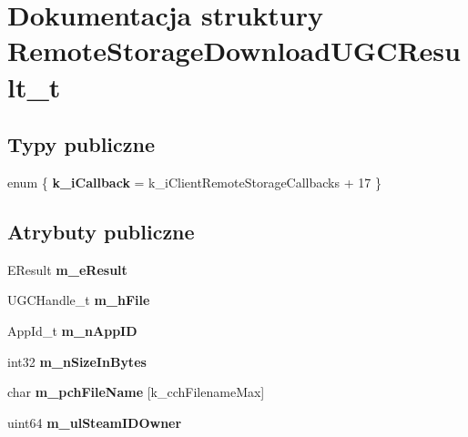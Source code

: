 \hypertarget{struct_remote_storage_download_u_g_c_result__t}{}\section{Dokumentacja struktury Remote\+Storage\+Download\+U\+G\+C\+Result\+\_\+t}
\label{struct_remote_storage_download_u_g_c_result__t}
\subsection*{Typy publiczne}
\begin{DoxyCompactItemize}
\item 
\mbox{\label{struct_remote_storage_download_u_g_c_result__t_a124c2a6e83082327dd38afdd26462eef}} 
enum \{ {\bfseries k\+\_\+i\+Callback} = k\+\_\+i\+Client\+Remote\+Storage\+Callbacks + 17
 \}
\end{DoxyCompactItemize}
\subsection*{Atrybuty publiczne}
\begin{DoxyCompactItemize}
\item 
\mbox{\label{struct_remote_storage_download_u_g_c_result__t_a3ac63272e086be4736891ce05f66298a}} 
E\+Result {\bfseries m\+\_\+e\+Result}
\item 
\mbox{\label{struct_remote_storage_download_u_g_c_result__t_afe4999ff833974b5185664d103dbc01d}} 
U\+G\+C\+Handle\+\_\+t {\bfseries m\+\_\+h\+File}
\item 
\mbox{\label{struct_remote_storage_download_u_g_c_result__t_acd2ce36445001e09db4bddd785a8b1cd}} 
App\+Id\+\_\+t {\bfseries m\+\_\+n\+App\+ID}
\item 
\mbox{\label{struct_remote_storage_download_u_g_c_result__t_a018726022adeb4bd79b229b6b8e45701}} 
int32 {\bfseries m\+\_\+n\+Size\+In\+Bytes}
\item 
\mbox{\label{struct_remote_storage_download_u_g_c_result__t_a43e6665bc0e47b33ac1312ef491e8834}} 
char {\bfseries m\+\_\+pch\+File\+Name} \mbox{[}k\+\_\+cch\+Filename\+Max\mbox{]}
\item 
\mbox{\label{struct_remote_storage_download_u_g_c_result__t_ad15e8f485ad8d4e7b089b0d37f6c4bcb}} 
uint64 {\bfseries m\+\_\+ul\+Steam\+I\+D\+Owner}
\end{DoxyCompactItemize}


